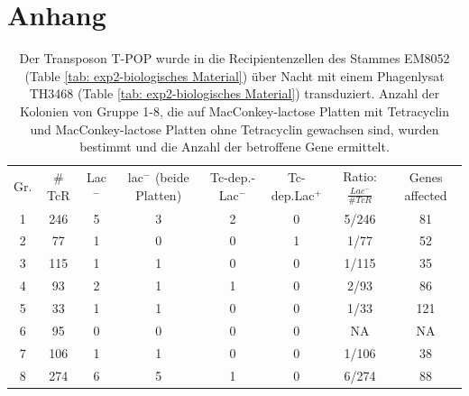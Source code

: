 \documentclass[oneside,10pt,a4paper]{report}
\begin{document}
	\chapter{Anhang}
\begin{table}[H]
	\centering
	\caption{Der Transposon T-POP wurde in die Recipientenzellen des Stammes EM8052 (Table \ref{tab: exp2-biologisches Material}) über Nacht mit einem Phagenlysat TH3468 (Table \ref{tab: exp2-biologisches Material}) transduziert. Anzahl der Kolonien von Gruppe 1-8, die auf MacConkey-lactose Platten mit Tetracyclin und MacConkey-lactose Platten ohne Tetracyclin gewachsen sind, wurden bestimmt und die Anzahl der betroffene Gene ermittelt.}
	\label{tab: exp2-Rohdaten}
	\begin{tabular}{cccccccc}
		\toprule
		\multirow{2}{*}{Gr.} & \multirow{2}{*}{$\#$TcR} & \multirow{2}{*}{Lac$^-$}&\multirow{2}{*}{lac$^-$ (beide Platten)} & \multirow{2}{*}{Tc-dep.-Lac$^-$}& \multirow{2}{*}{Tc-dep.Lac$^+$}& \multirow{2}{*}{Ratio: $\frac{Lac^-}{\#TcR}$}&\multirow{2}{*}{\parbox[*]{1.2cm}{Genes affected}}\\
		&&&&&&&\\
		\midrule
		1 & 246 & 5 & 3 & 2 & 0 & 5/246 & 81\\
		2 & 77 & 1 & 0 & 0 & 1 & 1/77 & 52\\
		3 & 115 & 1 & 1 & 0 & 0 & 1/115& 35\\
		4 & 93 & 2 & 1 & 1 & 0 & 2/93 & 86\\
		5 & 33 & 1 & 1 & 0 & 0 & 1/33& 121\\
		6 & 95 & 0 & 0 & 0 & 0 & NA & NA\\
		7 & 106 & 1 & 1 & 0 & 0 & 1/106 & 38\\
		8 & 274 & 6 & 5 & 1 & 0 & 6/274 & 88\\
		\bottomrule			
	\end{tabular}
\end{table}
	
	
	
	
	\nocite{*}
	
	\newpage
\end{document}
